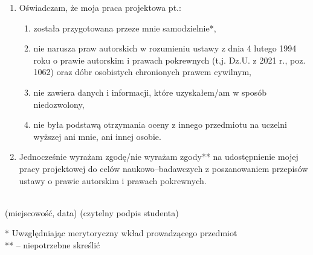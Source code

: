 \begin{enumerate}
    \item Oświadczam, że moja praca projektowa pt.: \@titlePL
          \begin{enumerate}[label=\arabic*)]
              \item została przygotowana przeze mnie samodzielnie*,
              \item nie narusza praw autorskich w rozumieniu ustawy z dnia 4 lutego 1994 roku o prawie autorskim i prawach pokrewnych (t.j. Dz.U. z 2021 r., poz. 1062) oraz dóbr osobistych chronionych prawem cywilnym,
              \item nie zawiera danych i informacji, które uzyskałem/am w sposób niedozwolony,
              \item nie była podstawą otrzymania oceny z innego przedmiotu na uczelni wyższej ani mnie, ani innej osobie.
          \end{enumerate}
    \item Jednocześnie wyrażam zgodę/nie wyrażam zgody** na udostępnienie mojej pracy projektowej do celów naukowo--badawczych z poszanowaniem przepisów ustawy o prawie autorskim i prawach pokrewnych.
\end{enumerate}


\vspace*{10mm}

\noindent
\underline{\hspace{6cm}} \hfill \underline{\hspace{6cm}} \\ %
\hspace*{13mm}(miejscowość, data)  \hspace*{63mm}(czytelny podpis studenta)
\vspace*{10mm}

\vfill
\noindent
* Uwzględniając merytoryczny wkład prowadzącego przedmiot \\
** -- niepotrzebne skreślić